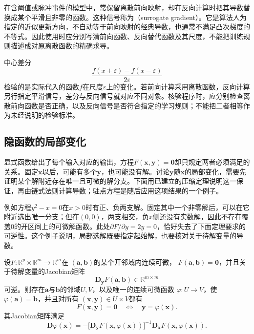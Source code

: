 在含阈值或脉冲事件的模型中，常保留离散前向映射，却在反向计算时把其导数替换成某个平滑且非零的函数。这种信号称为（surrogate gradient）。它是算法人为指定的近似更新方向，不自动等于前向映射的经典导数，也通常不满足凸次梯度的不等式。因此使用时应分别写清前向函数、反向替代函数及其尺度，不能把训练规则描述成对原离散函数的精确求导。

中心差分
\[   \frac{f(x+\varepsilon)-f(x-\varepsilon)}{2\varepsilon} \]
检验的是实际代入的函数$f$在尺度$\varepsilon$上的变化。若前向计算采用离散函数，反向计算另行指定平滑信号，差分与反向信号就对应不同对象。核验程序时，应分别检查离散前向函数是否正确，以及反向信号是否符合指定的学习规则；不能把二者相等作为未经说明的检验标准。

\subsection{隐函数的局部变化}
\label{sec:analysis-implicit-parameter-integral}

显式函数给出了每个输入对应的输出，方程$F(\bm x,\bm y)=\bm0$却只规定两者必须满足的关系。固定$\bm x$以后，可能有多个$\bm y$，也可能没有解。讨论$\bm y$随$\bm x$的局部变化，需要先证明某个解附近存在唯一且可微的解分支。下面用已建立的压缩定理说明这一保证，再由链式法则计算导数；驻点方程是随后应用这项结果的一个例子。

例如方程$y^2-x=0$在$x>0$时有正、负两支解。固定其中一个非零解后，可以在它附近选出唯一分支；但在$(0,0)$，两支相交，负$x$侧还没有实数解，因此不存在覆盖$0$的开区间上的可微解函数。此处$\partial F/\partial y=2y=0$，恰好失去了下面定理要求的可逆性。这个例子说明，局部选解既要指定起始解，也要核对关于待解变量的导数。

\begin{theorem}[隐函数定理]
\label{thm:analysis-implicit-function}
设$F:\mathbb{R}^p\times\mathbb{R}^m\to\mathbb{R}^m$在 $(\bm{a},\bm{b})$的某个开邻域内连续可微， $F(\bm{a},\bm{b})=\bm{0}$，并且关于待解变量的Jacobian矩阵 \[   \bm{D}_{\bm{y}}F(\bm{a},\bm{b})   \in\mathbb{R}^{m\times m} \]
可逆。则存在$\bm{a}$与$\bm{b}$的邻域$U,V$，以及唯一的连续可微函数
$\varphi:U\to V$，使$\varphi(\bm{a})=\bm{b}$，并且对所有
$(\bm{x},\bm{y})\in U\times V$都有
\[
  F(\bm{x},\bm{y})=\bm{0}
  \quad\Longleftrightarrow\quad
  \bm{y}=\varphi(\bm{x}).
\]
其Jacobian矩阵满足
\begin{equation}
  \bm{D}\varphi(\bm{x})
  =
  -
  \bigl[\bm{D}_{\bm{y}}F(\bm{x},\varphi(\bm{x}))\bigr]^{-1}
  \bm{D}_{\bm{x}}F(\bm{x},\varphi(\bm{x})).
\label{eq:analysis-implicit-derivative}
\end{equation}
\end{theorem}

